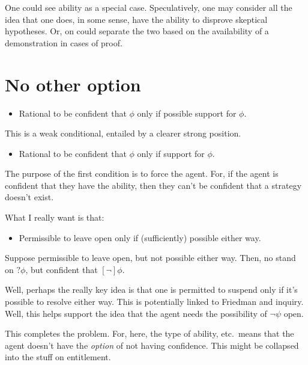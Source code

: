 \documentclass[10pt]{article}
\begin{document}
\begin{note}
  One could see ability as a special case.
  Speculatively, one may consider all the idea that one does, in some sense, have the ability to disprove skeptical hypotheses.
  Or, on could separate the two based on the availability of a demonstration in cases of proof.
\end{note}

\section{No other option}
\label{sec:no-other-option}

\begin{itemize}
\item Rational to be confident that \(\phi\) only if possible support for \(\phi\).
\end{itemize}

This is a weak conditional, entailed by a clearer strong position.

\begin{itemize}
\item Rational to be confident that \(\phi\) only if support for \(\phi\).
\end{itemize}

The purpose of the first condition is to force the agent.
For, if the agent is confident that they have the ability, then they can't be confident that a strategy doesn't exist.

What I really want is that:

\begin{itemize}
\item Permissible to leave open only if (sufficiently) possible either way.
\end{itemize}

Suppose permissible to leave open, but not possible either way.
Then, no stand on \(?\phi\), but confident that \([\lnot]\phi\).

Well, perhaps the really key idea is that one is permitted to suspend only if it's possible to resolve either way.
This is potentially linked to Friedman and inquiry.
Well, this helps support the idea that the agent needs the possibility of \(\lnot\psi\) open.



This completes the problem.
For, here, the type of ability, etc.\ means that the agent doesn't have the \emph{option} of not having confidence.
{
  \color{red}
  This might be collapsed into the stuff on entitlement.
}
\end{document}

